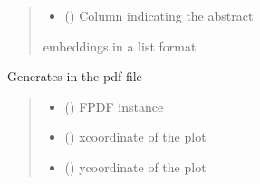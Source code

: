 \documentclass[letterpaper,10pt,english]{sphinxmanual}
\begin{document}
\begin{fulllineitems}
\begin{fulllineitems}
\begin{quote}
\begin{description}
\begin{itemize}
\item {} 
\sphinxAtStartPar
{} () \textendash{} Column indicating the abstract

\end{itemize}

\sphinxAtStartPar
embeddings in a list format

\end{description}\end{quote}

\end{fulllineitems}


\begin{fulllineitems}
\label{\detokenize{BeeLitReview:BeeLitReview.BeeLitReview.pdf_graph}}
\pysigstartsignatures
{}
\pysigstopsignatures
\sphinxAtStartPar
Generates in the pdf file
\begin{quote}\begin{description}
\begin{itemize}
\item {} 
\sphinxAtStartPar
{} () \textendash{} FPDF instance

\item {} 
\sphinxAtStartPar
{} () \textendash{} x\sphinxhyphen{}coordinate of the plot

\item {} 
\sphinxAtStartPar
{} () \textendash{} y\sphinxhyphen{}coordinate of the plot


\end{itemize}
\end{description}
\end{quote}
\end{fulllineitems}
\end{fulllineitems}
\end{document}
